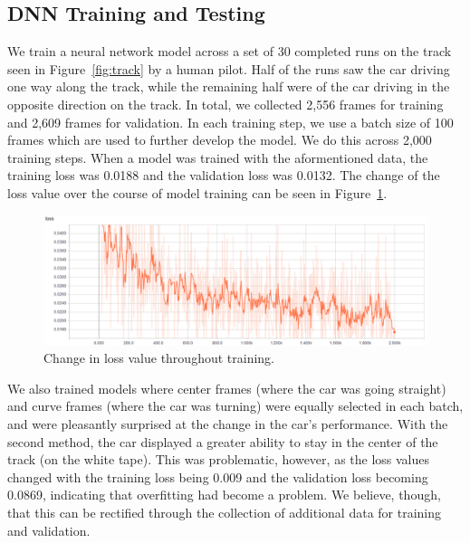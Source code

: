 \subsection{DNN Training and Testing}
We train a neural network model across a set of 30 completed runs on 
the track seen in Figure~\ref{fig:track} by a human pilot. Half of 
the runs saw the car driving one way along the track, while the 
remaining half were of the car driving in the opposite direction on 
the track. In total, we collected 2,556 frames for training and 2,609 
frames for validation. In each training step, we use a batch size of 
100 frames which are used to further develop the model. We do this 
across 2,000 training steps. When a model was trained with the 
aformentioned data, the training loss was 0.0188 and the validation 
loss was 0.0132. The change of the loss value over the course of model training can be seen in Figure~\ref{fig:modelloss}.

\begin{figure}[t]
  \centering
  \includegraphics[width=.9\textwidth]{figs/TrainingLoss}
  \caption{Change in loss value throughout training.}
  \label{fig:modelloss}
\end{figure}

We also trained models where center frames (where the car was going 
straight) and curve frames (where the car was turning) were equally 
selected in each batch, and were pleasantly surprised at the change 
in the car's performance. With the second method, the car displayed a 
greater ability to stay in the center of the track (on the white 
tape). This was problematic, however, as the loss values changed with 
the training loss being 0.009 and the validation loss becoming 
0.0869, indicating that overfitting had become a problem. We believe, 
though, that this can be rectified through the collection of 
additional data for training and validation.



